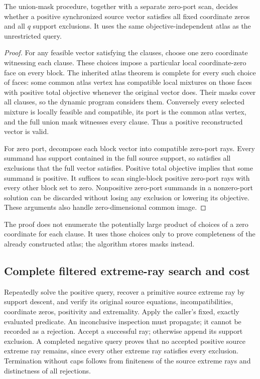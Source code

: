\begin{proposition}
The union-mask procedure, together with a separate zero-port scan,
decides whether a positive synchronized source vector satisfies all
fixed coordinate zeros and all $q$ support exclusions.  It uses the
same objective-independent atlas as the unrestricted query.
\end{proposition}
\begin{proof}
For any feasible vector satisfying the clauses, choose one zero
coordinate witnessing each clause.  These choices impose a particular
local coordinate-zero face on every block.  The inherited atlas theorem
is complete for every such choice of faces: some common atlas vertex
has compatible local mixtures on those faces with positive total
objective whenever the original vector does.  Their masks cover all
clauses, so the dynamic program considers them.  Conversely every
selected mixture is locally feasible and compatible, its port is the
common atlas vertex, and the full union mask witnesses every clause.
Thus a positive reconstructed vector is valid.

For zero port, decompose each block vector into compatible zero-port
rays.  Every summand has support contained in the full source support,
so satisfies all exclusions that the full vector satisfies.  Positive
total objective implies that some summand is positive.  It suffices to
scan single-block positive zero-port rays with every other block set
to zero.  Nonpositive zero-port summands in a nonzero-port solution
can be discarded without losing any exclusion or lowering its
objective.  These arguments also handle zero-dimensional common image.
\end{proof}

The proof does not enumerate the potentially large product of choices
of a zero coordinate for each clause.  It uses those choices only to
prove completeness of the already constructed atlas; the algorithm
stores masks instead.

\subsection{Complete filtered extreme-ray search and cost}

Repeatedly solve the positive query, recover a primitive source extreme
ray by support descent, and verify its original source equations,
incompatibilities, coordinate zeros, positivity and extremality.  Apply
the caller's fixed, exactly evaluated predicate.  An inconclusive
inspection must propagate; it cannot be recorded as a rejection.
Accept a successful ray; otherwise
append its support exclusion.  A completed negative query proves that
no accepted positive source extreme ray remains, since every other
extreme ray satisfies every exclusion.  Termination without caps follows
from finiteness of the source extreme rays and distinctness of all
rejections.

